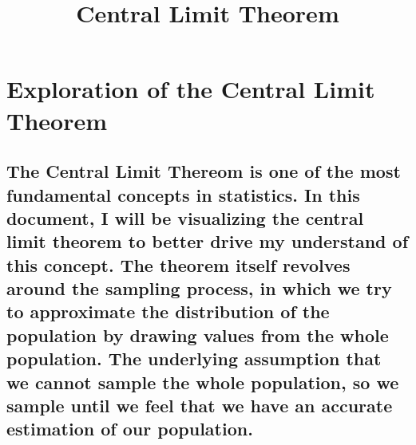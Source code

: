 \documentclass[
]{article}
\title{Central Limit Theorem}
\author{}
\date{\vspace{-2.5em}}
\begin{document}
\maketitle

\hypertarget{exploration-of-the-central-limit-theorem}{%
\section{Exploration of the Central Limit
Theorem}\label{exploration-of-the-central-limit-theorem}}

\hypertarget{the-central-limit-thereom-is-one-of-the-most-fundamental-concepts-in-statistics.-in-this-document-i-will-be-visualizing-the-central-limit-theorem-to-better-drive-my-understand-of-this-concept.-the-theorem-itself-revolves-around-the-sampling-process-in-which-we-try-to-approximate-the-distribution-of-the-population-by-drawing-values-from-the-whole-population.-the-underlying-assumption-that-we-cannot-sample-the-whole-population-so-we-sample-until-we-feel-that-we-have-an-accurate-estimation-of-our-population.}{%
\subsection{The Central Limit Thereom is one of the most fundamental
concepts in statistics. In this document, I will be visualizing the
central limit theorem to better drive my understand of this concept. The
theorem itself revolves around the sampling process, in which we try to
approximate the distribution of the population by drawing values from
the whole population. The underlying assumption that we cannot sample
the whole population, so we sample until we feel that we have an
accurate estimation of our
population.}\label{the-central-limit-thereom-is-one-of-the-most-fundamental-concepts-in-statistics.-in-this-document-i-will-be-visualizing-the-central-limit-theorem-to-better-drive-my-understand-of-this-concept.-the-theorem-itself-revolves-around-the-sampling-process-in-which-we-try-to-approximate-the-distribution-of-the-population-by-drawing-values-from-the-whole-population.-the-underlying-assumption-that-we-cannot-sample-the-whole-population-so-we-sample-until-we-feel-that-we-have-an-accurate-estimation-of-our-population.}}
\end{document}
